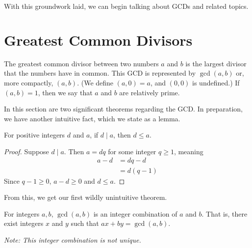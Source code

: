 \documentclass[../m55main.tex]{subfiles}
\begin{document}

With this groundwork laid, we can begin talking about GCDs and related topics.

\section{Greatest Common Divisors}
The greatest common divisor between two numbers $a$ and $b$ is the largest divisor that the numbers have in common.
This GCD is represented by $\gcd (a,b)$ or, more compactly, $(a,b)$.
(We define $(a,0) = a$, and $(0,0)$ is undefined.)
If $(a,b) = 1$, then we say that $a$ and $b$ are relatively prime.

In this section are two significant theorems regarding the GCD.
In preparation, we have another intuitive fact, which we state as a lemma.

\begin{lemma}
    For positive integers $d$ and $a$, if $d \mid a$, then $d \leq a$.
\end{lemma}

\begin{proof}
    Suppose $d \mid a$.
    Then $a = dq$ for some integer $q \geq 1$, meaning
    \begin{align*}
        a-d &= dq - d \\
        &= d (q-1)
    \end{align*}
    Since $q-1 \geq 0$, $a-d \geq 0$ and $d \leq a$.
\end{proof}

From this, we get our first wildly unintuitive theorem.

\begin{theorem}
    For integers $a,b$, $\gcd (a,b)$ is an integer combination of $a$ and $b$.
    That is, there exist integers $x$ and $y$ such that $ax + by = \gcd (a,b)$.

    \medskip
    \textit{Note: This integer combination is not unique.}
\end{theorem}
\end{document}
